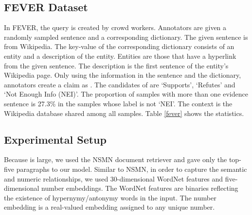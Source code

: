 \documentclass[11pt,a4paper]{article}
\theoremstyle{definition}
\begin{document}
	\subsection{FEVER Dataset}	
	In FEVER, the query  is created by crowd workers. Annotators are given a randomly sampled sentence and a corresponding dictionary. The given sentence is from Wikipedia. The key-value of the corresponding dictionary consists of an entity and a description of the entity. Entities are those that have a hyperlink from the given sentence. The description is the first sentence of the entity's Wikipedia page. Only using the information in the sentence and the dictionary, annotators create a claim as . The candidates of  are `Supports', `Refutes' and `Not Enough Info (NEI)'. The proportion of samples with more than one evidence sentence is 27.3\% in the samples whose label is not `NEI'.
	The context  is the Wikipedia database shared among all samples.
	Table \ref{fever} shows the statistics.
	
	\begin{table}[t]
		\begin{center}
		\end{center}\caption{Statistics of FEVER (the development set).}\label{fever}
	\end{table}

	\subsection{Experimental Setup}
	
	Because  is large, we used the NSMN document retriever \cite{fever1} and gave only the top-five paragraphs to our model. Similar to NSMN, in order to capture the semantic and numeric relationships, we used 30-dimensional WordNet features and five-dimensional number embeddings. The WordNet features are binaries reflecting the existence of hypernymy/antonymy words in the input. The number embedding is a real-valued embedding assigned to any unique number.
\end{document}
